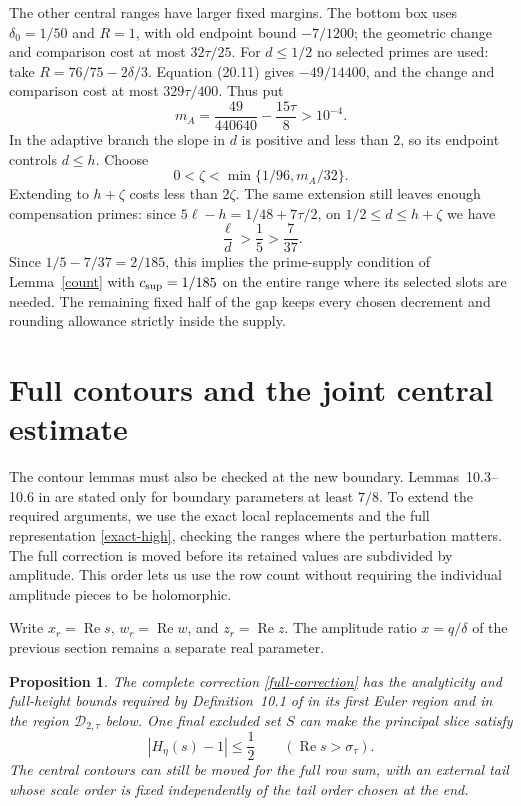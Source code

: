 \documentclass[10pt,reqno,a4paper]{amsart}
\newtheorem{proposition}[theorem]{Proposition}
\theoremstyle{remark}
\newcommand{\Rea}{\operatorname{Re}}
\newcommand{\st}{\sigma_\tau}
\begin{document}
The other central ranges have larger fixed margins. The bottom box
uses $\delta_0=1/50$ and $R=1$, with old endpoint bound $-7/1200$;
the geometric change and comparison cost at most $32\tau/25$.
For $d\le1/2$ no selected primes are used: take
$R=76/75-2\delta/3$. Equation (20.11) gives $-49/14400$, and the
change and comparison cost at most $329\tau/400$. Thus put
\begin{equation}\label{central-margin}
                 m_A=\frac{49}{440640}-\frac{15\tau}{8}>10^{-4}.
\end{equation}
In the adaptive branch the slope in $d$ is positive and less than
$2$, so its endpoint controls $d\le h$. Choose
\[
              0<\zeta<\min\{1/96,m_A/32\}.
\]
Extending to $h+\zeta$ costs less than $2\zeta$. The same extension
still leaves enough compensation primes: since
$5\ell-h=1/48+7\tau/2$, on $1/2\le d\le h+\zeta$ we have
\[
                       \frac\ell d>\frac15>\frac7{37}.
\]
Since $1/5-7/37=2/185$, this implies the prime-supply condition
of Lemma~\ref{count} with $c_{\rm sup}=1/185$ on the entire range
where its selected slots are needed. The remaining fixed half of the
gap keeps every chosen decrement and rounding allowance strictly
inside the supply.

\section{Full contours and the joint central estimate}\label{sec-contours}

The contour lemmas must also be checked at the new boundary.
Lemmas~10.3--10.6 in \cite{q30} are stated only for boundary parameters
at least $7/8$. To extend the required arguments, we use the exact local
replacements and the full representation \eqref{exact-high}, checking
the ranges where the perturbation matters. The full correction is moved
before its retained values are subdivided by amplitude. This order lets
us use the row count without requiring the individual amplitude pieces
to be holomorphic.

Write $x_r=\Rea s$, $w_r=\Rea w$, and $z_r=\Rea z$. The amplitude
ratio $x=q/\delta$ of the previous section remains a separate real
parameter.

\begin{proposition}\label{extended-euler}
The complete correction \eqref{full-correction} has the analyticity
and full-height bounds required by Definition~10.1 of \cite{q30}
in its first Euler region and in the region $\mathcal D_{2,\tau}$
below. One final excluded set $S$ can make the principal slice satisfy
\[
            |H_\eta(s)-1|\le\frac12\qquad(\Rea s>\st).
\]
The central contours can still be moved for the full row sum, with
an external tail whose scale order is fixed independently of the
tail order chosen at the end.
\end{proposition}
\end{document}

